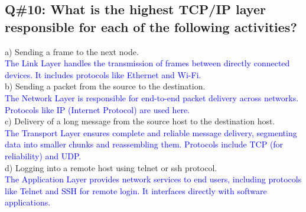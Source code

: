 \subsection*{Q\#10: What is the highest TCP/IP layer responsible for each of the following activities?}
a) Sending a frame to the next node.\\
\textcolor{blue}{
The Link Layer handles the transmission of frames between directly connected devices. It includes protocols like Ethernet and Wi-Fi.
}\\
b) Sending a packet from the source to the destination.\\
\textcolor{blue}{
The Network Layer is responsible for end-to-end packet delivery across networks. Protocols like IP (Internet Protocol) are used here.
}\\
c) Delivery of a long message from the source host to the destination host.\\
\textcolor{blue}{
The Transport Layer ensures complete and reliable message delivery, segmenting data into smaller chunks and reassembling them. Protocols include TCP (for reliability) and UDP.
}\\
d) Logging into a remote host using telnet or ssh protocol.\\
\textcolor{blue}{
The Application Layer provides network services to end users, including protocols like Telnet and SSH for remote login. It interfaces directly with software applications.
}